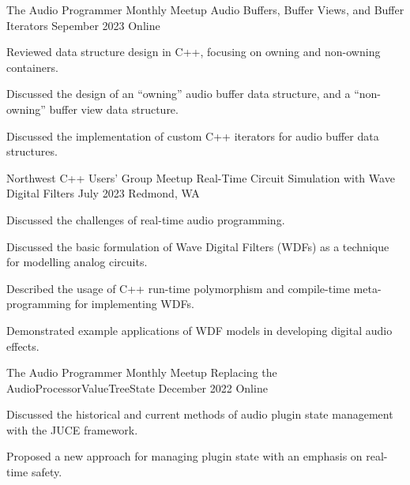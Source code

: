 \begin{cventries}
\cventry
{The Audio Programmer Monthly Meetup} %
{Audio Buffers, Buffer Views, and Buffer Iterators} %
{Sepember 2023} %
{Online} %
{
  \begin{cvitems} %
    \item {Reviewed data structure design in C++, focusing on owning and non-owning containers.}
    \item {Discussed the design of an ``owning'' audio buffer data structure, and a ``non-owning'' buffer view data structure.}
    \item {Discussed the implementation of custom C++ iterators for audio buffer data structures.}
  \end{cvitems}
}

  \cventry
    {Northwest C++ Users' Group Meetup} %
    {Real-Time Circuit Simulation with Wave Digital Filters} %
    {July 2023} %
    {Redmond, WA} %
    {
      \begin{cvitems} %
        \item {Discussed the challenges of real-time audio programming.}
        \item {Discussed the basic formulation of Wave Digital Filters (WDFs) as a technique for modelling analog circuits.}
        \item {Described the usage of C++ run-time polymorphism and compile-time meta-programming for implementing WDFs.}
        \item {Demonstrated example applications of WDF models in developing digital audio effects.}
      \end{cvitems}
    }

  \cventry
    {The Audio Programmer Monthly Meetup} %
    {Replacing the AudioProcessorValueTreeState} %
    {December 2022} %
    {Online} %
    {
      \begin{cvitems} %
        \item {Discussed the historical and current methods of audio plugin state management with the JUCE framework.}
        \item {Proposed a new approach for managing plugin state with an emphasis on real-time safety.}
      \end{cvitems}
    }



\end{cventries}

